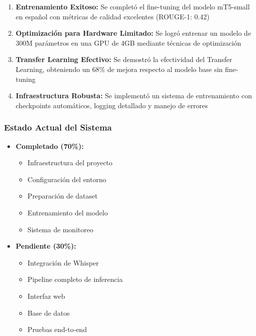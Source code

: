 \documentclass[12pt,a4paper]{article}
\begin{document}
\begin{enumerate}
    \item \textbf{Entrenamiento Exitoso:} Se completó el fine-tuning del modelo mT5-small en español con métricas de calidad excelentes (ROUGE-1: 0.42)
    
    \item \textbf{Optimización para Hardware Limitado:} Se logró entrenar un modelo de 300M parámetros en una GPU de 4GB mediante técnicas de optimización
    
    \item \textbf{Transfer Learning Efectivo:} Se demostró la efectividad del Transfer Learning, obteniendo un 68\% de mejora respecto al modelo base sin fine-tuning
    
    \item \textbf{Infraestructura Robusta:} Se implementó un sistema de entrenamiento con checkpoints automáticos, logging detallado y manejo de errores
\end{enumerate}

\subsubsection{Estado Actual del Sistema}

\begin{itemize}
    \item \textbf{Completado (70\%):}
    \begin{itemize}
        \item Infraestructura del proyecto
        \item Configuración del entorno
        \item Preparación de dataset
        \item Entrenamiento del modelo
        \item Sistema de monitoreo
    \end{itemize}
    
    \item \textbf{Pendiente (30\%):}
    \begin{itemize}
        \item Integración de Whisper
        \item Pipeline completo de inferencia
        \item Interfaz web
        \item Base de datos
        \item Pruebas end-to-end
    \end{itemize}
\end{itemize}
\end{document}
